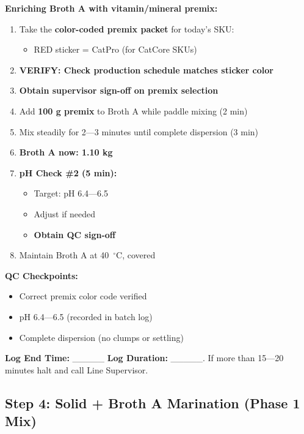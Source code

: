 {\textbf{Enriching Broth A with vitamin/mineral premix:}
\begin{enumerate}[resume,leftmargin=1.5em]
\item Take the \textbf{color-coded premix packet} for today's SKU:
  \begin{itemize}
  \item RED sticker = CatPro (for CatCore SKUs)
  \end{itemize}
\item \textbf{VERIFY: Check production schedule matches sticker color}
\item \textbf{Obtain supervisor sign-off on premix selection}
\item Add \textbf{100 g premix} to Broth A while paddle mixing (2 min)
\item Mix steadily for 2---3 minutes until complete dispersion (3 min)
\item \textbf{Broth A now: 1.10 
kg}
\item \textbf{pH Check \#2 (5 min):}
  \begin{itemize}
  \item Target: pH 6.4---6.5
  \item Adjust if needed
  \item \textbf{Obtain QC sign-off}
  \end{itemize}
\item Maintain Broth A at 40~$^\circ$C, covered
\end{enumerate}

\textbf{QC Checkpoints:}
\begin{itemize}
\item Correct premix color code verified
\item pH 6.4---6.5 (recorded in batch log)
\item Complete dispersion (no clumps or settling)
\end{itemize}
\textbf{Log End Time:} \_\_\_\_\_
\textbf{Log Duration:} \_\_\_\_\_.
If more than 15---20 minutes halt and call Line Supervisor.



\subsection*{Step 4: Solid + Broth A Marination (Phase 1 Mix)}

}
